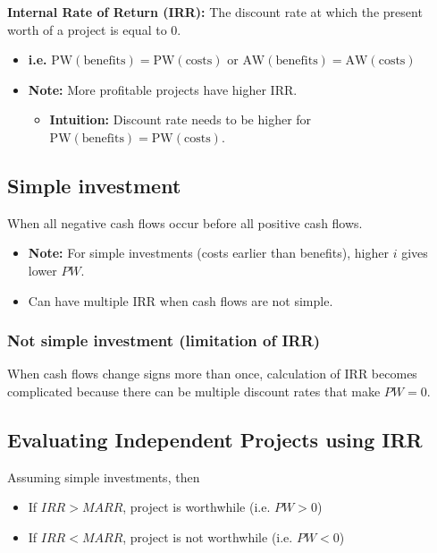 \begin{definition}
    \textbf{Internal Rate of Return (IRR):} The discount rate at which the present worth of a project is equal to 0.
            \begin{itemize}
                \item \textbf{i.e.} $\text{PW}(\text{benefits}) = \text{PW}(\text{costs})$ or $\text{AW}(\text{benefits}) = \text{AW}(\text{costs})$
                \item \textbf{Note:} More profitable projects have higher IRR.
                \begin{itemize}
                    \item \textbf{Intuition:} Discount rate needs to be higher for $\text{PW}(\text{benefits}) = \text{PW}(\text{costs})$.
                \end{itemize}
            \end{itemize}
\end{definition}

\subsection{Simple investment}
\begin{definition}

    When all negative cash flows occur before all positive cash flows.
        \begin{itemize}
            \item \textbf{Note:} For simple investments (costs earlier than benefits), higher $i$ gives lower $PW$.
            \item Can have multiple IRR when cash flows are not simple.
        \end{itemize}
\end{definition}

\subsubsection{Not simple investment (limitation of IRR)}
\begin{definition}
    When cash flows change signs more than once, calculation of IRR becomes complicated because there can be multiple discount rates that make $PW=0$.
\end{definition}

\subsection{Evaluating Independent Projects using IRR}
\begin{definition}
    Assuming simple investments, then 
    \begin{itemize}
        \item If $IRR > MARR$, project is worthwhile (i.e. $PW>0$)
        \item If $IRR < MARR$, project is not worthwhile (i.e. $PW<0$)
    \end{itemize}

\end{definition}


